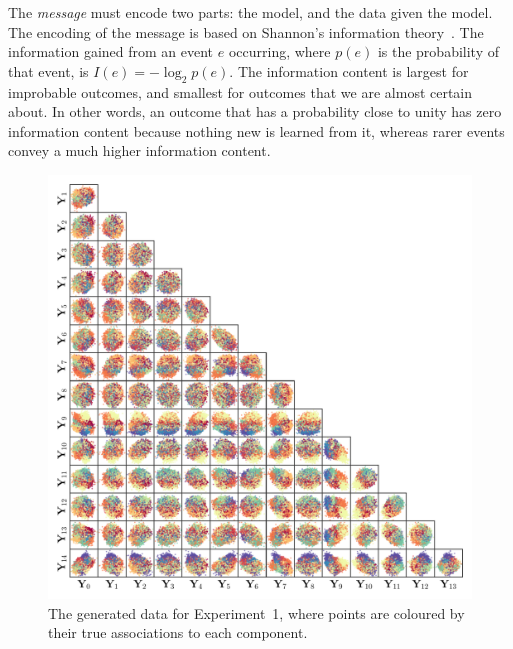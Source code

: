 \documentclass[twocolumn]{aastex62}
\begin{document}
The \textit{message} must encode two parts: the model, and the data given the
model. The encoding of the message is based on Shannon's information theory~\citep{Shannon:1948}. 
The information gained from an event $e$ occurring, where $p(e)$ is the
probability of that event, is $I(e) = -\log_{2}{p(e)}$. The information content
is largest for improbable outcomes, and smallest for outcomes that we are 
almost certain about. In other words, an outcome that has a probability close
to unity has zero information content because nothing new is learned from it,
whereas rarer events convey a much higher information content. 



\begin{figure}
	\includegraphics[width=1.0\textwidth]{experiments/exp1-data-colour.pdf}
    \caption{The generated data for Experiment~1, where points are coloured by their
		     true associations to each component.}
    \label{fig:exp1-data}
\end{figure}
\end{document}
